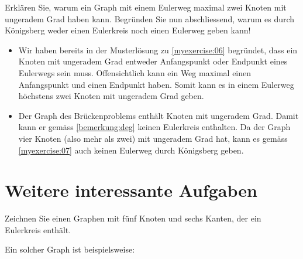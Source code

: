 \begin{myexercise}\label{myexercise:07}
	Erklären Sie, warum ein Graph mit einem Eulerweg maximal zwei Knoten mit ungeradem Grad haben kann. Begründen Sie nun abschliessend, warum es durch Königsberg weder einen Eulerkreis noch einen Eulerweg geben kann!
	\begin{myanswer}\label{myexercise:07-sol}
		\begin{itemize}
			\item Wir haben bereits in der Musterlösung zu \cref{myexercise:06} begründet, dass ein Knoten mit ungeradem Grad entweder Anfangspunkt oder Endpunkt eines Eulerwegs sein muss. Offensichtlich kann ein Weg maximal einen Anfangspunkt und einen Endpunkt haben. Somit kann es in einem Eulerweg höchstens zwei Knoten mit ungeradem Grad geben.
			\item Der Graph des Brückenproblems enthält Knoten mit ungeradem Grad. Damit kann er gemäss \cref{bemerkung:deg} keinen Eulerkreis enthalten. Da der Graph vier Knoten (also mehr als zwei) mit ungeradem Grad hat, kann es gemäss \cref{myexercise:07} auch keinen Eulerweg durch Königsberg geben.
		\end{itemize}
	\end{myanswer}
\end{myexercise}

\clearpage
\section{Weitere interessante Aufgaben}
\begin{myexercise}\label{myexercise:08}
	Zeichnen Sie einen Graphen mit fünf Knoten und sechs Kanten, der ein Eulerkreis enthält.
	\begin{myanswer}\label{myexercise:08-sol}
		Ein solcher Graph ist beispielsweise:
		\begin{figure}[H]
			\centering
		\end{figure}
	\end{myanswer}
\end{myexercise}

